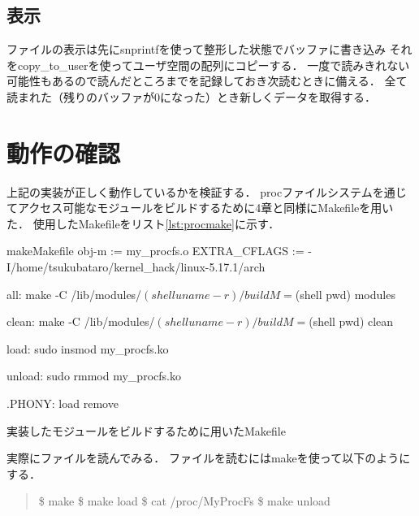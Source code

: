 \subsection{表示}
ファイルの表示は先にsnprintfを使って整形した状態でバッファに書き込み
それをcopy_to_userを使ってユーザ空間の配列にコピーする．
一度で読みきれない可能性もあるので読んだところまでを記録しておき次読むときに備える．
全て読まれた（残りのバッファが0になった）とき新しくデータを取得する．

\section{動作の確認}
上記の実装が正しく動作しているかを検証する．
procファイルシステムを通じてアクセス可能なモジュールをビルドするために4章と同様にMakefileを用いた．
使用したMakefileをリスト\ref{lst:procmake}に示す．
\begin{longlisting}
\begin{myminted}{make}{Makefile}
obj-m := my_procfs.o
EXTRA_CFLAGS := -I/home/tsukubataro/kernel_hack/linux-5.17.1/arch

all:
	make -C /lib/modules/$(shell uname -r)/build M=$(shell pwd) modules

clean:
	make -C /lib/modules/$(shell uname -r)/build M=$(shell pwd) clean

load:
	sudo insmod my_procfs.ko

unload:
	sudo rmmod my_procfs.ko

.PHONY: load remove
\end{myminted}
\caption{実装したモジュールをビルドするために用いたMakefile}
\label{lst:procmake}
\end{longlisting}

実際にファイルを読んでみる．
ファイルを読むにはmakeを使って以下のようにする．
\begin{quote}
\$ make
\$ make load
\$ cat /proc/MyProcFs
\$ make unload
\end{quote}
